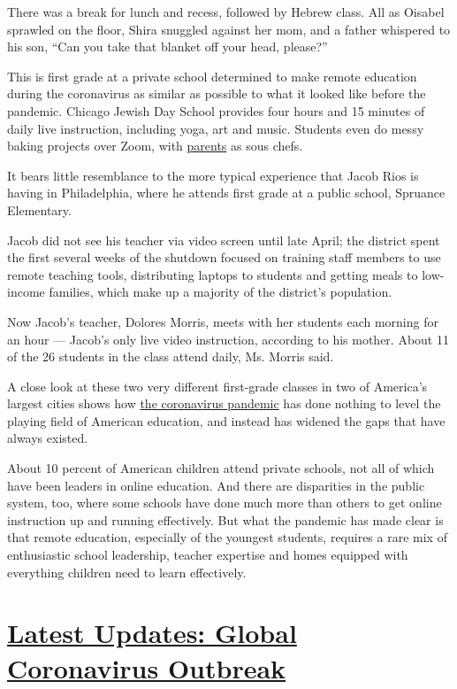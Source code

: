 There was a break for lunch and recess, followed by Hebrew class. All as
Oisabel sprawled on the floor, Shira snuggled against her mom, and a
father whispered to his son, ``Can you take that blanket off your head,
please?''

This is first grade at a private school determined to make remote
education during the coronavirus as similar as possible to what it
looked like before the pandemic. Chicago Jewish Day School provides four
hours and 15 minutes of daily live instruction, including yoga, art and
music. Students even do messy baking projects over Zoom, with
\href{https://www.nytimes3xbfgragh.onion/2020/05/10/us/coronavirus-giving-birth-new-mothers.html}{parents}
as sous chefs.

It bears little resemblance to the more typical experience that Jacob
Rios is having in Philadelphia, where he attends first grade at a public
school, Spruance Elementary.

Jacob did not see his teacher via video screen until late April; the
district spent the first several weeks of the shutdown focused on
training staff members to use remote teaching tools, distributing
laptops to students and getting meals to low-income families, which make
up a majority of the district's population.

Now Jacob's teacher, Dolores Morris, meets with her students each
morning for an hour --- Jacob's only live video instruction, according
to his mother. About 11 of the 26 students in the class attend daily,
Ms. Morris said.

A close look at these two very different first-grade classes in two of
America's largest cities shows how
\href{https://www.nytimes3xbfgragh.onion/news-event/coronavirus}{the
coronavirus pandemic} has done nothing to level the playing field of
American education, and instead has widened the gaps that have always
existed.

About 10 percent of American children attend private schools, not all of
which have been leaders in online education. And there are disparities
in the public system, too, where some schools have done much more than
others to get online instruction up and running effectively. But what
the pandemic has made clear is that remote education, especially of the
youngest students, requires a rare mix of enthusiastic school
leadership, teacher expertise and homes equipped with everything
children need to learn effectively.

\hypertarget{latest-updates-global-coronavirus-outbreak}{%
\section{\texorpdfstring{\href{https://www.nytimes3xbfgragh.onion/2020/08/04/world/coronavirus-cases.html?action=click\&pgtype=Article\&state=default\&region=MAIN_CONTENT_1\&context=storylines_live_updates}{Latest
Updates: Global Coronavirus
Outbreak}}{Latest Updates: Global Coronavirus Outbreak}}\label{latest-updates-global-coronavirus-outbreak}}

